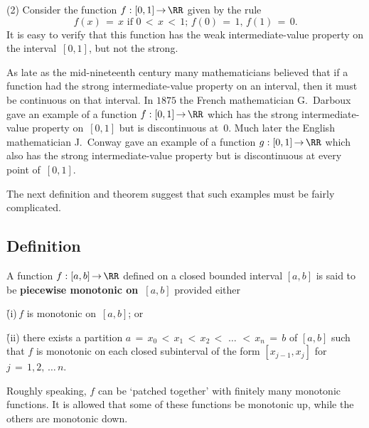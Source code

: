 \V

        (2) Consider the function $f:[0,1] \,{\rightarrow}\, {\RR}$ given by the rule
        \begin{displaymath}
        f(x) \,=\, x \mbox{ if $0\,<\,x\,<\,1$};\, f(0) \,=\, 1,\,f(1) \,=\, 0.
        \end{displaymath}
    It is easy to verify that this function has the weak intermediate-value property on the interval~$[0,1]$, but not the strong.

\VV


        As late as the mid-nineteenth century many mathematicians believed that if a function had the strong intermediate-value property on an interval,
    then it must be continuous on that interval. In $1875$ the French mathematician G.~Darboux gave an example of a function
    $f:[0,1] \,{\rightarrow}\, {\RR}$ which has the strong intermediate-value property on~$[0,1]$ but is discontinuous at~$0$.
    Much later the English mathematician J.~Conway gave an example of a function $g:[0,1] \,{\rightarrow}\, {\RR}$ which also has the strong intermediate-value property but is discontinuous at every point of~$[0,1]$.

        The next definition and theorem suggest that such examples must be fairly complicated.

\V

            \subsection{\small{\bf Definition}}
            \label{DefD25.50B}

\V

        A function $f:[a,b] \,{\rightarrow}\, {\RR}$ defined on a closed bounded interval $[a,b]$ is said to be
    {\bf piecewise monotonic on~$[a,b]$} provided either

\VA

        \h (i)\,$f$ is monotonic on~$[a,b]$; or

        \h (ii) there exists a partition $a \,=\, x_{0}\,<\,x_{1}\,<\,x_{2}\,<\,\,{\ldots}\,\,<\,x_{n} \,=\, b$ of $[a,b]$
    such that $f$ is monotonic on each closed subinterval of the form $[x_{j-1},x_{j}]$ for $j \,=\, 1,2,\,{\ldots}\,n$.

\VA

\noindent Roughly speaking, $f$ can be `patched together' with finitely many monotonic functions.
    It is allowed that some of these functions be monotonic up, while the others are monotonic down.


